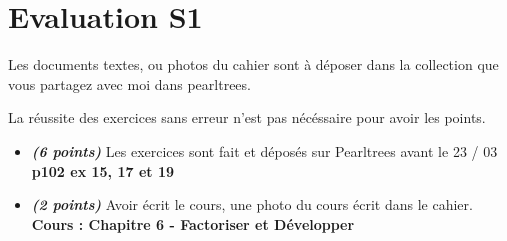 \documentclass[11pt]{article}
\newcommand{\tempsexo}[1]{\textit{\textbf{(#1)}}}
\begin{document}
\section{Evaluation S1 }

Les documents textes, ou photos du cahier sont à déposer dans la collection que vous partagez avec moi dans pearltrees.

La réussite des exercices sans erreur n'est pas nécéssaire pour avoir les points.

	\begin{itemize} 
	  \item \tempsexo{6 points} Les exercices sont fait et déposés sur Pearltrees avant le 23 / 03 \\	
    \textbf{p102 ex 15, 17 et 19}
	

	  \item \tempsexo{2 points} Avoir écrit le cours, une photo du cours écrit dans le cahier.
		\textbf{Cours : Chapitre 6 - Factoriser et Développer}
\end{itemize}	
\end{document}
